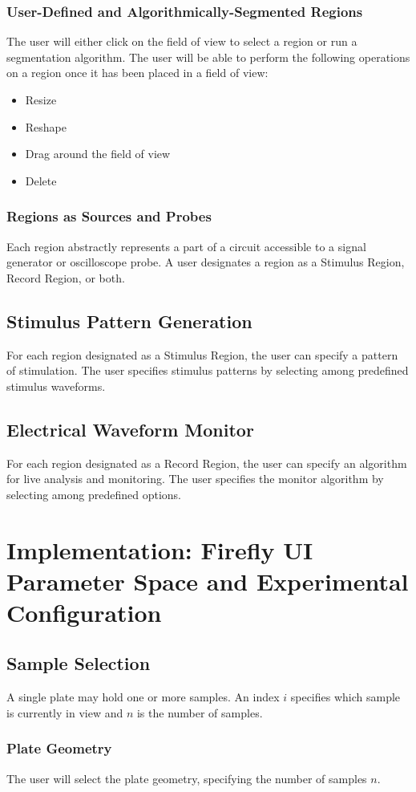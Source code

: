 \documentclass[a4paper,12pt]{article}
\begin{document}
\subsubsection{User-Defined and Algorithmically-Segmented Regions}
The user will either click on the field of view to select a region or run a 
segmentation algorithm. The user will be able to perform the following 
operations on a region once it has been placed in a field of view:
\begin{itemize}
  \item Resize
  \item Reshape
  \item Drag around the field of view
  \item Delete
\end{itemize}
\subsubsection{Regions as Sources and Probes}
Each region abstractly represents a part of a circuit accessible to a signal
generator or oscilloscope probe. A user designates a region as a Stimulus Region,
Record Region, or both.
\subsection{Stimulus Pattern Generation}
For each region designated as a Stimulus Region, the user can specify a pattern
of stimulation. The user specifies stimulus patterns by selecting among
predefined stimulus waveforms.
\subsection{Electrical Waveform Monitor}
For each region designated as a Record Region, the user can specify an algorithm
for live analysis and monitoring. The user specifies the monitor algorithm by 
selecting among predefined options.
\section{Implementation: Firefly UI Parameter Space and Experimental Configuration}
\subsection{Sample Selection}
A single plate may hold one or more samples. An index $i$ specifies which 
sample is currently in view and $n$ is the number of samples.
\subsubsection{Plate Geometry}
The user will select the plate geometry, specifying the number of samples $n$.
\end{document}
